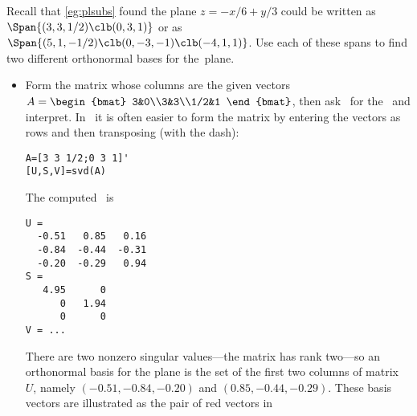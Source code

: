 \begin{example} \label{eg:orthospan}
Recall that \cref{eg:plsubs} found the plane \(z=-x/6+y/3\) could be written as \(\Span\{(3,3,1/2)\clb (0,3,1)\}\) or as \(\Span\{(5,1,-1/2)\clb (0,-3,-1)\clb (-4,1,1)\}\).
Use each of these spans to find two different orthonormal bases for the~plane.
\begin{solution} 
\begin{itemize}
\item Form the matrix whose columns are the given vectors
\(A=\begin{bmat} 3&0\\3&3\\1/2&1 \end{bmat}\),
then ask \script\ for the \svd\ and interpret.
In \script\ it is often easier to form the matrix by entering the vectors as rows and then transposing (with the dash):
\begin{verbatim}
A=[3 3 1/2;0 3 1]'
[U,S,V]=svd(A)
\end{verbatim}
\setbox\ajrqrbox\hbox{}%
\marginajrbox%
The computed \svd\ is \twodp
\begin{verbatim}
U =
  -0.51   0.85   0.16
  -0.84  -0.44  -0.31
  -0.20  -0.29   0.94
S =
   4.95      0
      0   1.94
      0      0
V = ...
\end{verbatim}
There are two nonzero singular values---the matrix has rank two---so an orthonormal basis for the plane is the set of the first two columns of matrix~\(U\), namely  \((-0.51,-0.84,-0.20)\) and \((0.85,-0.44,-0.29)\).
These basis vectors are illustrated as the pair of red vectors in 
\begin{center}
 {}%
\end{center}


\end{itemize}
\end{solution}
\end{example}
